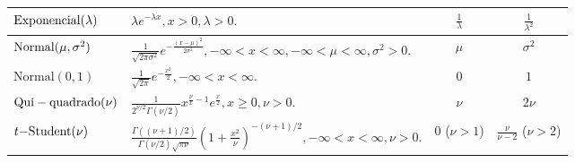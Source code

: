 \documentclass[10pt]{article}%
\renewcommand{\ra}[1]{\renewcommand{\arraystretch}{#1}}
\def\Var{{\rm Var}\,}
\def\E{{\rm E}\,}
\begin{document}
\begin{table*}[ht]
\begin{tabular}{@{}llcc@{}}
\midrule
${\rm Exponencial}(\lambda)$ &  $\displaystyle{\lambda e^{-\lambda x}, x > 0, \lambda > 0.}$ & $\displaystyle{\frac{1}{\lambda}}$ & $\displaystyle{\frac{1}{\lambda^2}}$\\
\midrule
${\rm Normal}(\mu, \sigma^2)$ & $\displaystyle{\frac{1}{\sqrt{2\pi\sigma^2}}e^{-\frac{(x-\mu)^2}{2\sigma^2}}, -\infty < x < \infty, -\infty < \mu < \infty,  \sigma^2 > 0.}$& $\mu$ & $\sigma^2$\\
\midrule
$\mbox{Normal}(0, 1)$ & $\displaystyle{\frac{1}{\sqrt{2\pi}}e^{-\frac{x^2}{2}}, -\infty < x < \infty.}$& $0$ & $1$\\
\midrule
${\rm Qui-quadrado}(\nu)$ & $\displaystyle{\frac{1}{2^{\nu/2}\Gamma(\nu/2)}x^{\frac{\nu}{x} - 1}e^{\frac{x}{2}}, x \geq 0, \nu > 0.}$& $\nu$ & $2\nu$\\
\midrule
$t{\rm -Student}(\nu)$ & $\displaystyle{\frac{\Gamma((\nu+1)/2)}{\Gamma(\nu/2)\sqrt{\pi\nu}}\left(1+\frac{x^2}{\nu}\right)^{-(\nu+1)/2}, -\infty < x < \infty, \nu > 0.}$& $0$ ($\nu > 1$)& $\frac{\nu}{\nu - 2}$ ($\nu > 2$)\\
\bottomrule
\end{tabular}
\end{table*}

\end{document}
